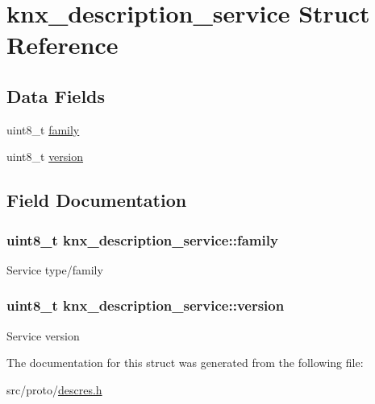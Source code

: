 \hypertarget{structknx__description__service}{}\section{knx\+\_\+description\+\_\+service Struct Reference}
\label{structknx__description__service}
\subsection*{Data Fields}
\begin{DoxyCompactItemize}
\item 
uint8\+\_\+t \hyperlink{structknx__description__service_a1d929d790c0300e7695ec4cc35464025}{family}
\item 
uint8\+\_\+t \hyperlink{structknx__description__service_a81cf1ccae45b0b11f8078f6c36086319}{version}
\end{DoxyCompactItemize}


\subsection{Field Documentation}
\subsubsection[{\texorpdfstring{family}{family}}]{\setlength{\rightskip}{0pt plus 5cm}uint8\+\_\+t knx\+\_\+description\+\_\+service\+::family}\hypertarget{structknx__description__service_a1d929d790c0300e7695ec4cc35464025}{}\label{structknx__description__service_a1d929d790c0300e7695ec4cc35464025}
Service type/family 
\subsubsection[{\texorpdfstring{version}{version}}]{\setlength{\rightskip}{0pt plus 5cm}uint8\+\_\+t knx\+\_\+description\+\_\+service\+::version}\hypertarget{structknx__description__service_a81cf1ccae45b0b11f8078f6c36086319}{}\label{structknx__description__service_a81cf1ccae45b0b11f8078f6c36086319}
Service version 

The documentation for this struct was generated from the following file\+:\begin{DoxyCompactItemize}
\item 
src/proto/\hyperlink{descres_8h}{descres.\+h}\end{DoxyCompactItemize}
